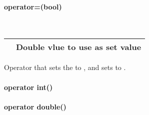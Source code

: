 \documentclass[letterpaper,10pt,english]{sphinxmanual}
\begin{document}
\paragraph{operator=(bool)}
\label{\detokenize{datapoint:operator-bool}}

\begin{fulllineitems}
\label{\detokenize{datapoint:_CPPv2N6pessum9DataPointaSEb}}%
\pysigstartmultiline
{}%
\pysigstopmultiline~

\begin{savenotes}\sphinxattablestart
\centering
\begin{tabulary}{\linewidth}[t]{|T|T|}
\hline

&
Double vlue to use as set value
\\
\hline
\end{tabulary}
\par
\sphinxattableend\end{savenotes}

Operator that sets the  to , and sets
 to .

\end{fulllineitems}



\paragraph{operator int()}
\label{\detokenize{datapoint:id1}}

\begin{fulllineitems}
\label{\detokenize{datapoint:_CPPv2N6pessum9DataPointcviEv}}%
\pysigstartmultiline
{}%
\pysigstopmultiline
{} 

\end{fulllineitems}



\paragraph{operator double()}
\label{\detokenize{datapoint:id2}}
\end{document}
